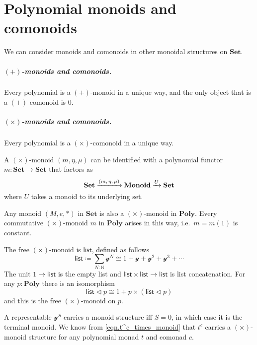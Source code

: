 \documentclass[11pt, one side, article]{memoir}
\theoremstyle{definition}
\theoremstyle{plain}
\newcommand{\Cat}[1]{\mathbf{#1}}%
\newcommand{\Fun}[1]{\mathsf{#1}}%
\newcommand{\To}[2][]{\xrightarrow[#1]{\tn{$#2$}}}
\newcommand{\tn}[1]{\textnormal{#1}}
\newcommand{\nn}{\mathbb{N}}
\newcommand{\smset}{\Cat{Set}}
\newcommand{\List}{\Fun{list}}
\newcommand{\yon}{{\mathcal{y}}}
\newcommand{\poly}{\Cat{Poly}}
\newcommand{\0}{\textsf{0}}
\newcommand{\1}{\tn{\textsf{1}}}
\newcommand{\tri}{\mathbin{\triangleleft}}
\newcommand{\uu}{\List}
\begin{document}
\chapter{Polynomial monoids and comonoids}\label{chap.monoids.comonoids}

We can consider monoids and comonoids in other monoidal structures on $\smset$. 

\paragraph{$(+)$-monoids and comonoids.}
Every polynomial is a $(+)$-monoid in a unique way, and the only object that is a $(+)$-comonoid is $0$.

\paragraph{$(\times)$-monoids and comonoids.}
Every polynomial is a $(\times)$-comonoid in a unique way.

A $(\times)$-monoid $(m,\eta,\mu)$ can be identified with a polynomial functor $m\colon\smset\to\smset$ that factors as
\begin{equation}
	\smset\To{(m,\eta,\mu)}\Cat{Monoid}\To{U}\smset
\end{equation}
where $U$ takes a monoid to its underlying set.

Any monoid $(M,e,*)$ in $\smset$ is also a $(\times)$-monoid in $\poly$. Every commutative $(\times)$-monoid $m$ in $\poly$ arises in this way, i.e.\ $m=m(1)$ is constant.

The free $(\times)$-monoid is $\uu$, defined as follows
\begin{equation}\label{eqn.list}
\uu\coloneqq\sum_{N:\nn}\yon^N\cong 1+\yon+\yon^2+\yon^3+\cdots
\end{equation}
The unit $1\to\uu$ is the empty list and $\uu\times\uu\to\uu$ is list concatenation. For any $p:\poly$ there is an isomorphism
\begin{equation}\label{eqn.unfolding_list}
\uu\tri p\cong 1+p\times(\uu\tri p)
\end{equation}
and this is the free $(\times)$-monoid on $p$.

A representable $\yon^S$ carries a monoid structure iff $S=0$, in which case it is the terminal monoid. We know from \eqref{eqn.t^c_times_monoid} that $t^c$ carries a $(\times)$-monoid structure for any polynomial monad $t$ and comonad $c$.
\end{document}
